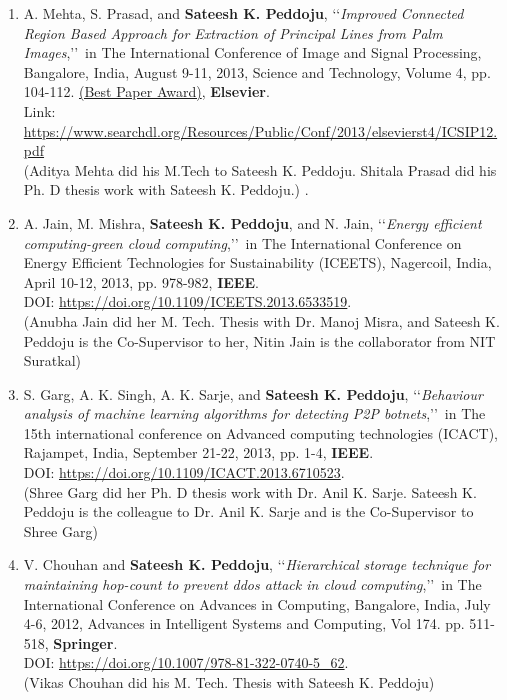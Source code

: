 \begin{enumerate}
	
	\item
	A. Mehta, S. Prasad, and  \textbf{Sateesh K. Peddoju}, \lq\lq \textit{Improved Connected Region Based Approach for Extraction of Principal Lines from Palm Images},\rq\rq\, in The International Conference of Image and Signal Processing, Bangalore, India, August 9-11, 2013, Science and Technology, Volume 4, pp. 104-112. \underline{(Best Paper Award)}, \textbf{Elsevier}. \\ Link: \url{https://www.searchdl.org/Resources/Public/Conf/2013/elsevierst4/ICSIP12.pdf} \\(Aditya Mehta did his M.Tech to Sateesh K. Peddoju. Shitala Prasad did his Ph. D thesis work with Sateesh K. Peddoju.) . 


	
	\item
	A. Jain, M. Mishra, \textbf{Sateesh K. Peddoju}, and N. Jain, \lq\lq \textit{Energy efficient computing-green cloud computing},\rq\rq\, in The International Conference on Energy Efficient Technologies for Sustainability (ICEETS), Nagercoil, India, April 10-12, 2013, pp. 978-982, \textbf{IEEE}. \\DOI: \url{https://doi.org/10.1109/ICEETS.2013.6533519}. \\(Anubha Jain did her M. Tech. Thesis with Dr. Manoj Misra, and Sateesh K. Peddoju is the Co-Supervisor to her, Nitin Jain is the collaborator from NIT Suratkal)
	
	\item
	S. Garg, A. K. Singh, A. K. Sarje, and \textbf{Sateesh K. Peddoju}, \lq\lq \textit{Behaviour analysis of machine learning algorithms for detecting P2P botnets},\rq\rq\, in The 15th international conference on Advanced computing technologies (ICACT), Rajampet, India, September 21-22, 2013, pp. 1-4,  \textbf{IEEE}. \\DOI: \url{https://doi.org/10.1109/ICACT.2013.6710523}.	\\(Shree Garg did her Ph. D thesis work with Dr. Anil K. Sarje.  Sateesh K. Peddoju is the colleague to Dr. Anil K. Sarje and is the Co-Supervisor to Shree Garg)

	
	\item
	V. Chouhan and \textbf{Sateesh K. Peddoju}, \lq\lq \textit{Hierarchical storage technique for maintaining hop-count to prevent ddos attack in cloud computing},\rq\rq\, in The International Conference on Advances in Computing, Bangalore, India, July 4-6, 2012, Advances in Intelligent Systems and Computing, Vol 174. pp. 511-518, \textbf{Springer}. \\DOI: \url{https://doi.org/10.1007/978-81-322-0740-5_62}. \\(Vikas Chouhan did his M. Tech. Thesis with Sateesh K. Peddoju)
	

\end{enumerate}

